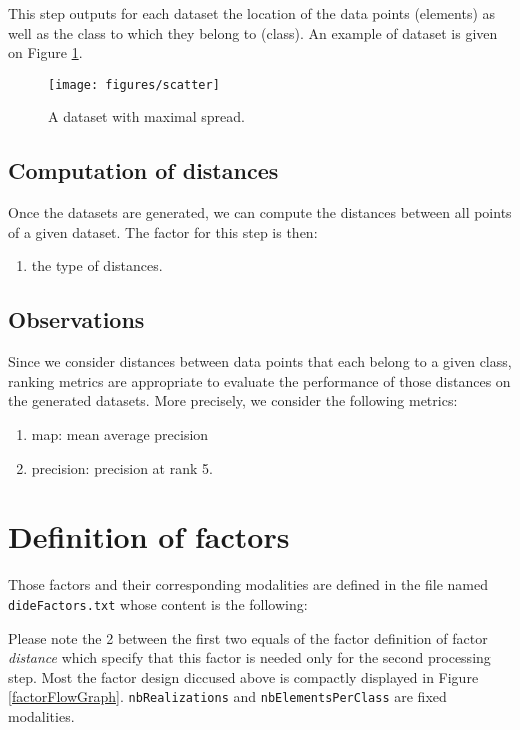 \documentclass[10pt,a4paper,fleqn]{article}
\begin{document}
This step outputs for each dataset the location of the data points (elements) as well as the class to which they belong to (class). An example of dataset is given on Figure \ref{scatter}.

\begin{figure}
\texttt{[image: figures/scatter]}
\caption{A dataset with maximal spread.}
\label{scatter}
\end{figure}

\subsection{Computation of distances}

Once the datasets are generated, we can compute the distances between all points of a given dataset. The factor for this step is then:
\begin{enumerate}
\item the type of distances.
\end{enumerate}

\subsection{Observations}

Since we consider distances between data points that each belong to a given class, ranking metrics are appropriate to evaluate the performance of those distances on the generated datasets. More precisely, we consider the following metrics:
\begin{enumerate}
\item map: mean average precision
\item precision: precision at rank 5.
\end{enumerate}

\section{Definition of factors}

Those factors and their corresponding modalities are defined in the file named \texttt{dideFactors.txt} whose content is the following:


Please note the 2 between the first two equals of the factor definition of factor \textit{distance} which specify that this factor is needed only for the second processing step. Most the factor design diccused above is compactly displayed in Figure \ref{factorFlowGraph}. \texttt{nbRealizations} and \texttt{nbElementsPerClass} are fixed modalities.
\end{document}
